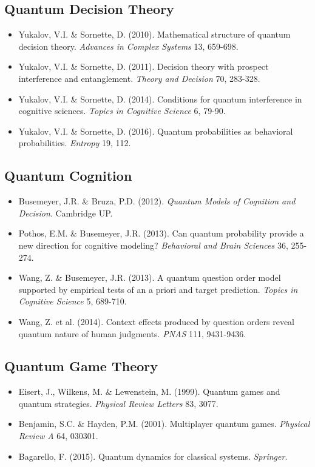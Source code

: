 \documentclass[11pt]{article}
\begin{document}
\subsection{Quantum Decision Theory}
\label{sec:org2be310c}
\begin{itemize}
\item Yukalov, V.I. \& Sornette, D. (2010). Mathematical structure of quantum decision theory. \emph{Advances in Complex Systems} 13, 659-698.
\item Yukalov, V.I. \& Sornette, D. (2011). Decision theory with prospect interference and entanglement. \emph{Theory and Decision} 70, 283-328.
\item Yukalov, V.I. \& Sornette, D. (2014). Conditions for quantum interference in cognitive sciences. \emph{Topics in Cognitive Science} 6, 79-90.
\item Yukalov, V.I. \& Sornette, D. (2016). Quantum probabilities as behavioral probabilities. \emph{Entropy} 19, 112.
\end{itemize}
\subsection{Quantum Cognition}
\label{sec:org36473e1}
\begin{itemize}
\item Busemeyer, J.R. \& Bruza, P.D. (2012). \emph{Quantum Models of Cognition and Decision}. Cambridge UP.
\item Pothos, E.M. \& Busemeyer, J.R. (2013). Can quantum probability provide a new direction for cognitive modeling? \emph{Behavioral and Brain Sciences} 36, 255-274.
\item Wang, Z. \& Busemeyer, J.R. (2013). A quantum question order model supported by empirical tests of an a priori and target prediction. \emph{Topics in Cognitive Science} 5, 689-710.
\item Wang, Z. et al. (2014). Context effects produced by question orders reveal quantum nature of human judgments. \emph{PNAS} 111, 9431-9436.
\end{itemize}
\subsection{Quantum Game Theory}
\label{sec:org849fd9c}
\begin{itemize}
\item Eisert, J., Wilkens, M. \& Lewenstein, M. (1999). Quantum games and quantum strategies. \emph{Physical Review Letters} 83, 3077.
\item Benjamin, S.C. \& Hayden, P.M. (2001). Multiplayer quantum games. \emph{Physical Review A} 64, 030301.
\item Bagarello, F. (2015). Quantum dynamics for classical systems. \emph{Springer}.
\end{itemize}
\end{document}

